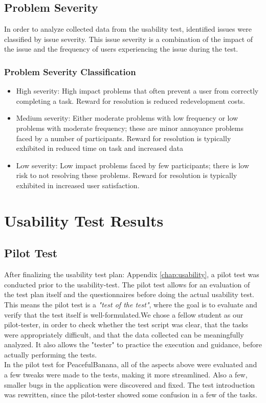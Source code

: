 \subsection{Problem Severity}
In order to analyze collected data from the usability test, identified issues were classified by issue severity. This issue severity is a combination of the impact of the issue and the frequency of users experiencing the issue during the test. 
\subsubsection{Problem Severity Classification}
	\begin{itemize}
		\item High severity: High impact problems that often prevent a user from correctly completing a task. Reward for resolution is reduced redevelopment costs.
		\item Medium severity: Either moderate problems with low frequency or low problems with moderate frequency; these are minor annoyance problems faced by a number of participants. Reward for resolution is typically exhibited in reduced time on task and increased data
		\item Low severity: Low impact problems faced by few participants; there is low risk to not resolving these problems. Reward for resolution is typically exhibited in increased user satisfaction.
	\end{itemize}

\newpage
\section{Usability Test Results}
\subsection{Pilot Test}
After finalizing the usability test plan: Appendix \ref{chap:usability}, a pilot test was conducted prior to the usability-test\citep{usabilitygov}. The pilot test allows for an evaluation of the test plan itself and the questionnaires before doing the actual usability test. This means the pilot test is a \emph{"test of the test"}, where the goal is to evaluate and verify that the test itself is well-formulated.We chose a fellow student as our pilot-tester, in order to check whether the test script was clear, that the tasks were appropriately difficult, and that the data collected can be meaningfully analyzed. 
It also allows the "tester" to practice the execution and guidance, before actually performing the tests. \\
In the pilot test for PeacefulBanana, all of the aspects above were evaluated and a few tweaks were made to the tests, making it more streamlined. Also a few, smaller bugs in the application were discovered and fixed. The test introduction was rewritten, since the pilot-tester showed some confusion in a few of the tasks. 


